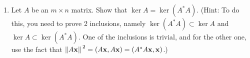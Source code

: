 \documentclass[../psets.tex]{subfiles}
\begin{document}
\begin{enumerate}[label={\textbf{5.\arabic*.}}]
\begin{proof}[Answer]
\begin{align*}
                P_{\ker A^*} &= \frac{1}{(-1)^2+(-1)^2+1^2}
                \begin{pmatrix}
                    -1\\
                    -1\\
                    1\\
                \end{pmatrix}
                \begin{pmatrix}
                    -1 & -1 & 1\\
                \end{pmatrix}\\
            &= \frac{1}{6}
            \begin{pmatrix}
                1 & 1 & -2\\
                1 & 1 & -2\\
                -2 & -2 & 4\\
            \end{pmatrix}&
                &= \frac{1}{3}
                \begin{pmatrix}
                    1 & 1 & -1\\
                    1 & 1 & -1\\
                    -1 & -1 & 1\\
                \end{pmatrix}
        \end{align*}
        It follows that
        \begin{align*}
            P_{\range A^*} &= \frac{1}{6}
            \begin{pmatrix}
                5 & -1 & 2\\
                -1 & 5 & 2\\
                2 & 2 & 2\\
            \end{pmatrix}&
            P_{\range A} &= \frac{1}{3}
            \begin{pmatrix}
                2 & -1 & 1\\
                -1 & 2 & 1\\
                1 & 1 & 2\\
            \end{pmatrix}
        \end{align*}
    \end{proof}
    \item Let $A$ be an $m\times n$ matrix. Show that $\ker A=\ker(A^*A)$. (Hint: To do this, you need to prove 2 inclusions, namely $\ker(A^*A)\subset\ker A$ and $\ker A\subset\ker(A^*A)$. One of the inclusions is trivial, and for the other one, use the fact that $\norm*{A\mathbf{x}}^2=(A\mathbf{x},A\mathbf{x})=(A^*A\mathbf{x},\mathbf{x})$.)

\end{enumerate}
\end{document}
